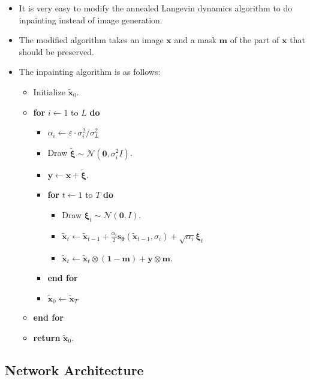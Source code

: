 \documentclass[10pt]{article}
\newcommand{\ve}[1]{\mathbf{#1}}
\newcommand{\ves}[1]{\boldsymbol{#1}}
\newcommand{\mcal}[1]{\mathcal{#1}}
\begin{document}
\begin{itemize}
  \item It is very easy to modify the annealed Langevin dynamics algorithm to do inpainting instead of image generation.
  
  \item The modified algorithm takes an image $\ve{x}$ and a mask $\ve{m}$ of the part of $\ve{x}$ that should be preserved.
  
  \item The inpainting algorithm is as follows:
  \begin{itemize}
    \item[] Initialize $\widetilde{\ve{x}}_0$.
    \item[] {\bf for} $i \gets 1$ to $L$ {\bf do}
    \begin{itemize}
      \item[] $\alpha_i \gets \varepsilon \cdot \sigma_i^2 / \sigma_L^2$
      \item[] Draw $\widetilde{\ves{\xi}} \sim \mcal{N}(\ve{0},\sigma^2_i I)$.
      \item[] $\ve{y} \gets \ve{x} + \widetilde{\ves{\xi}}$.
      \item[] {\bf for} $t \gets 1$ to $T$ {\bf do}
      \begin{itemize}
        \item[] Draw $\ves{\xi}_t \sim \mcal{N}(\ve{0},I)$.
        \item[] $\widetilde{\ve{x}}_t \gets \widetilde{\ve{x}}_{t-1} + \frac{\alpha_i}{2}\ve{s}_{\ves{\theta}}(\widetilde{\ve{x}}_{t-1}, \sigma_i) + \sqrt{\alpha_i} \ve{\xi}_t $
        \item[] $\widetilde{\ve{x}}_t \gets \widetilde{\ve{x}}_t \otimes (\ve{1} - \ve{m}) + \ve{y} \otimes \ve{m}$. 
      \end{itemize}
      \item[] {\bf end for}
      \item[] $\widetilde{\ve{x}}_0 \gets \widetilde{\ve{x}}_T$
    \end{itemize}
    \item[] {\bf end for}
    \item[] {\bf return} $\widetilde{\ve{x}}_0$.
  \end{itemize}
\end{itemize}

\subsection{Network Architecture}
\end{document}
